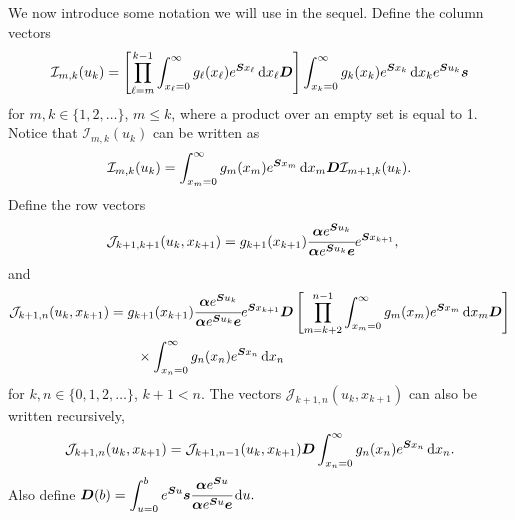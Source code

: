 We now introduce some notation we will use in the sequel. Define the column vectors 
\begin{align}
	\mathcal I_{m,k}(u_k) = \left[\prod_{\ell=m}^{k-1}\int_{x_\ell=0}^\infty g_\ell(x_\ell) e^{\boldsymbol{S}x_\ell}\, \mathrm{d} x_\ell \boldsymbol{D} \right]
            	\int_{x_k=0}^\infty g_{k}(x_k) e^{\boldsymbol{S}x_k} \, \mathrm{d} x_k e^{\boldsymbol{S}u_k}\boldsymbol s
\end{align}
for \(m,k\in\{1,2,\dots\}\), \(m\leq k\), where a product over an empty set is equal to 1. Notice that \(\mathcal I_{m,k}(u_k)\) can be written as 
\begin{align}
	\mathcal I_{m,k}(u_k) = \int_{x_m=0}^\infty g_m(x_m)e^{\boldsymbol Sx_m} \, \mathrm{d} x_m \boldsymbol D \mathcal I_{m+1,k}(u_k). \label{eqn: I recursive} 
\end{align}
Define the row vectors 
\begin{align}
	\mathcal J_{k+1,k+1}(u_k,x_{k+1}) &= g_{k+1}(x_{k+1})\cfrac{\boldsymbol \alpha e^{\boldsymbol{S}u_{k}}}{\boldsymbol \alpha e^{\boldsymbol{S}u_{k}}\boldsymbol e}e^{\boldsymbol{S}x_{k+1}},
\end{align}
and
\begin{align}
	\mathcal J_{k+1,n}(u_k,x_{k+1}) &= g_{k+1}(x_{k+1})\cfrac{\boldsymbol \alpha e^{\boldsymbol{S}u_{k}}}{\boldsymbol \alpha e^{\boldsymbol{S}u_{k}}\boldsymbol e} e^{\boldsymbol{S}x_{k+1}} \boldsymbol{D} \left[\prod_{m=k+2}^{n-1}\int_{x_{m}=0}^\infty g_{m}(x_{m}) e^{\boldsymbol{S}x_{m}} \, \mathrm{d} x_{m} \boldsymbol{D} \right]\nonumber
            	\\&\qquad\times\int_{x_n=0}^\infty g_{n}(x_n) e^{\boldsymbol{S}x_n} \, \mathrm{d} x_n
\end{align}
for \(k,n\in\{0,1,2,\dots\}\), \(k+1<n\). The vectors \(\mathcal J_{k+1,n}(u_k,x_{k+1})\) can also be written recursively, 
\begin{align}
	\mathcal J_{k+1,n}(u_k,x_{k+1}) = \mathcal J_{k+1,n-1}(u_k,x_{k+1})\boldsymbol D \int_{x_n=0}^\infty g_n(x_n)e^{\boldsymbol Sx_n}\, \mathrm{d} x_n.\label{eqn: J recursive} 
\end{align}
Also define \(\displaystyle\boldsymbol D(b) = \int_{u=0}^be^{\boldsymbol Su}\boldsymbol s \cfrac{\boldsymbol\alpha e^{\boldsymbol S u}}{\boldsymbol \alpha e^{\boldsymbol S u}\boldsymbol e} \, \mathrm{d} u.\)

